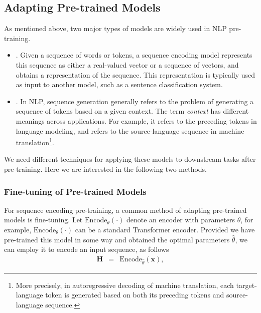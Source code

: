 \subsection{Adapting Pre-trained Models}

\noindent As mentioned above, two major types of models are widely used in NLP pre-training.

\begin{itemize}
\item \vspace{0.5em} . Given a sequence of words or tokens, a sequence encoding model represents this sequence as either a real-valued vector or a sequence of vectors, and obtains a representation of the sequence. This representation is typically used as input to another model, such as a sentence classification system.
\item \vspace{0.3em} . In NLP, sequence generation generally refers to the problem of generating a sequence of tokens based on a given context. The term \textit{context} has different meanings across applications. For example, it refers to the preceding tokens in language modeling, and refers to the source-language sequence in machine translation\footnote{More precisely, in autoregressive decoding of machine translation, each target-language token is generated based on both its preceding tokens and source-language sequence.}.
\end{itemize}
\vspace{0.5em}

We need different techniques for applying these models to downstream tasks after pre-training. Here we are interested in the following two methods.

\subsubsection{Fine-tuning of Pre-trained Models}
\label{sec:fine-tuning-encoders}

\noindent For sequence encoding pre-training, a common method of adapting pre-trained models is fine-tuning. Let $\mathrm{Encode}_{\theta}(\cdot)$ denote an encoder with parameters $\theta$, for example, $\mathrm{Encode}_{\theta}(\cdot)$ can be a standard Transformer encoder. Provided we have pre-trained this model in some way and obtained the optimal parameters $\hat{\theta}$, we can employ it to encode an input sequence, as follows
\begin{eqnarray}
\mathbf{H} & = & \mathrm{Encode}_{\hat{\theta}}(\mathbf{x}),
\end{eqnarray}

